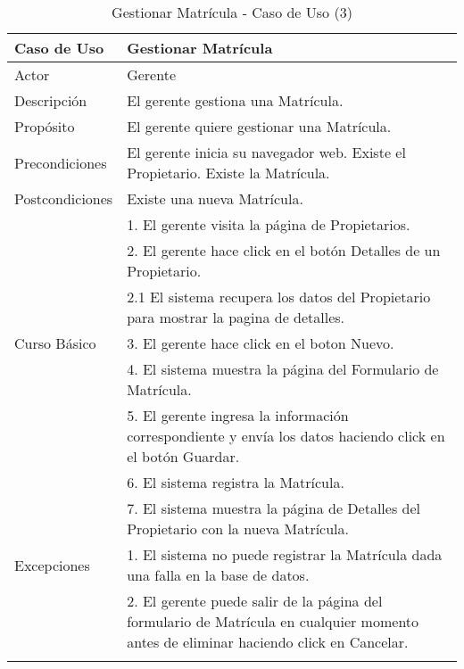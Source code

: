 \begin{longtable}{@{} p{3cm} p{10cm} @{}} \toprule
    \textbf{Caso de Uso}    & Gestionar Matrícula \\ \midrule
    Actor                   & Gerente \\ \cmidrule{1-2}
    Descripción             & El gerente gestiona una Matrícula. \\ \cmidrule{1-2}
    Propósito               & El gerente quiere gestionar una Matrícula. \\ \cmidrule{1-2}
    Precondiciones          & El gerente inicia su navegador web. Existe el Propietario. Existe la Matrícula. \\ \cmidrule{1-2} 
    Postcondiciones         & Existe una nueva Matrícula. \\ \cmidrule{1-2} 
                            & 1. El gerente visita la página de Propietarios. \\ 
                            & 2. El gerente hace click en el botón Detalles de un Propietario. \\
                            & 2.1 El sistema recupera los datos del Propietario para mostrar la pagina de detalles. \\
    Curso Básico            & 3. El gerente hace click en el boton Nuevo. \\
                            & 4. El sistema muestra la página del Formulario de Matrícula. \\
                            & 5. El gerente ingresa la información correspondiente y envía los datos haciendo click en el botón Guardar. \\ 
                            & 6. El sistema registra la Matrícula. \\ 
                            & 7. El sistema muestra la página de Detalles del Propietario con la nueva Matrícula. \\ \cmidrule{1-2}
    Excepciones             & 1. El sistema no puede registrar la Matrícula dada una falla en la base de datos. \\
                            & 2. El gerente puede salir de la página del formulario de Matrícula en cualquier momento antes de eliminar haciendo click en Cancelar. \\ \bottomrule
   \caption{Gestionar Matrícula - Caso de Uso (3)} \label{tab:tabcu-matri1} \\
   \end{longtable}

